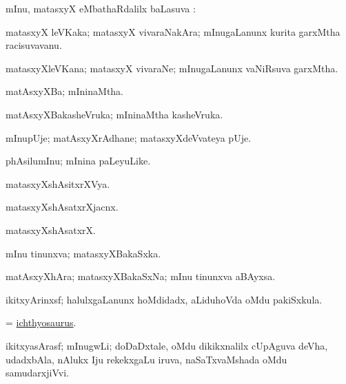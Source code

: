 \bentry
{}
\gl{\sapUpa}
\bmng
mInu, matasxyX eMbathaRdalilx baLasuva \pUparx:  
\emng
\eentry

\bentry
{}
\gl{\nA}
\bmng
matasxyX leVKaka; matasxyX vivaraNakAra; mInugaLanunx kurita garxMtha racisuvavanu. 
\emng
\eentry

\bentry
{}
\gl{\nA}
\bmng
matasxyXleVKana; matasxyX vivaraNe; mInugaLanunx vaNiRsuva garxMtha. 
\emng
\eentry

\bentry
{}
\gl{\gu}
\bmng
matAsxyXBa; mIninaMtha. 
\emng
\eentry

\bentry
{}
\gl{\nA}
\bmng
matAsxyXBakasheVruka; mIninaMtha kasheVruka. 
\emng
\eentry

\bentry
{}
\gl{\nA}
\bmng
mInupUje; matAsxyXrAdhane; matasxyXdeVvateya pUje. 
\emng
\eentry

\bentry
{}
\gl{\nA}
\bmng
phAsilumInu; mInina paLeyuLike. 
\emng
\eentry

\bentry
{}
\gl{\gu}
\bmng
matasxyXshAsitxrXVya. 
\emng
\eentry

\bentry
{}
\gl{\nA}
\bmng
matasxyXshAsatxrXjacnx. 
\emng
\eentry

\bentry
{}
\gl{\nA}
\bmng
matasxyXshAsatxrX. 
\emng
\eentry

\bentry
{}
\gl{\gu}
\bmng
mInu tinunxva; matasxyXBakaSxka. 
\emng
\eentry

\bentry
{}
\gl{\nA}
\bmng
matAsxyXhAra; matasxyXBakaSxNa; mInu tinunxva aBAyxsa. 
\emng
\eentry

\bentry
{}
\gl{\nA}
\expl{\Gk}
\bmng
ikitxyArinxsf; halulxgaLanunx hoMdidadx, aLiduhoVda oMdu pakiSxkula. 
\emng
\eentry

\bentry
{}
\gl{\nA}
\bmng
 = \hyperlink{ichthyosaurus}{ichthyosaurus}. 
\emng
\eentry

\bentry
{}
\gl{\nA}
\bmng
ikitxyasArasf; mInugwLi; doDaDxtale, oMdu dikikxnalilx cUpAguva deVha, udadxbAla, nAlukx Iju rekekxgaLu iruva, naSaTxvaMshada oMdu samudarxjiVvi.   
\emng
\eentry

